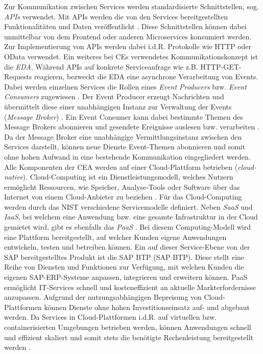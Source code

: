 Zur Kommunikation zwischen Services werden standardisierte Schnittstellen, sog. \textit{\ac*{APIs}} verwendet. Mit APIs werden die von den Services bereitgestellten Funktionalitäten und Daten veröffentlicht \cite[15]{Biehl.2015}. Diese Schnittstellen können dabei unmittelbar von dem Frontend oder anderen Microservices konsumiert werden. Zur Implementierung von APIs werden dabei i.d.R. Protokolle wie HTTP oder OData verwendet. Ein weiteres bei CEs verwendetes Kommunikationskonzept ist die \textit{\ac{EDA}}. Während APIs auf konkrete Serviceanfrage wie z.B. HTTP-GET-Requests reagieren, bezweckt die \acs{EDA} eine asynchrone Verarbeitung von Events. Dabei werden einzelnen Services die Rollen eines \textit{Event Producers} bzw. \textit{Event Consumers} zugewiesen \cite[51]{Bruns.2010}. Der Event Producer erzeugt Nachrichten und übermittelt diese einer unabhängigen Instanz zur Verwaltung der Events (\textit{Message Broker}) \cite[61]{Bruns.2010}. Ein Event Consumer kann dabei bestimmte Themen des Message Brokers abonnieren und  gesendete Ereignisse auslesen bzw. verarbeiten \cite[54]{Bruns.2010}. Da der Message Broker eine unabhängige Vermittlungsinstanz zwischen den Services darstellt, können neue Dienste Event-Themen abonnieren und somit ohne hohen Aufwand in eine bestehende Kommunikation eingegliedert werden. Alle Komponenten der CEA werden auf einer Cloud-Plattform betrieben (\textit{cloud-native}). Cloud-Computing ist ein Dienstleistungsmodell, welches Nutzern ermöglicht Ressourcen, wie Speicher, Analyse-Tools oder Software über das Internet von einem Cloud-Anbieter zu beziehen \cite[5]{Reinheimer.2018}. Für das Cloud-Computing werden durch das \ac{NIST} verschiedene Servicemodelle definiert. Neben \textit{\ac{SaaS}} und \textit{\ac{IaaS}}, bei welchem  eine Anwendung bzw. eine gesamte Infrastruktur in der Cloud gemietet wird, gibt es ebenfalls das \textit{\ac{PaaS}} \cite{Reinheimer.2018} \cite[9]{Reinheimer.2018}. Bei diesem Computing-Modell wird eine Plattform bereitgestellt, auf welcher Kunden eigene Anwendungen entwickeln, testen und betreiben können. Ein auf dieser Service-Ebene von der SAP bereitgestelltes Produkt ist die SAP \acl{BTP} (SAP \acs{BTP}). Diese stellt eine Reihe von Diensten und Funktionen zur Verfügung, mit welchen Kunden die eigenen SAP-ERP-Systeme anpassen, integrieren und erweitern können. PaaS ermöglicht IT-Services schnell und kosteneffizient an aktuelle Markterfordernisse anzupassen. Aufgrund der nutzungsabhängigen Bepreisung von Cloud-Plattformen können Dienste ohne hohen Investitionseinsatz auf- und abgebaut werden. Da Services in Cloud-Plattformen i.d.R. auf virtuellen bzw. containerisierten Umgebungen betrieben werden, können Anwendungen schnell und effizient skaliert und somit stets die benötigte Rechenleistung bereitgestellt werden \cite[10]{Reinheimer.2018}. 

